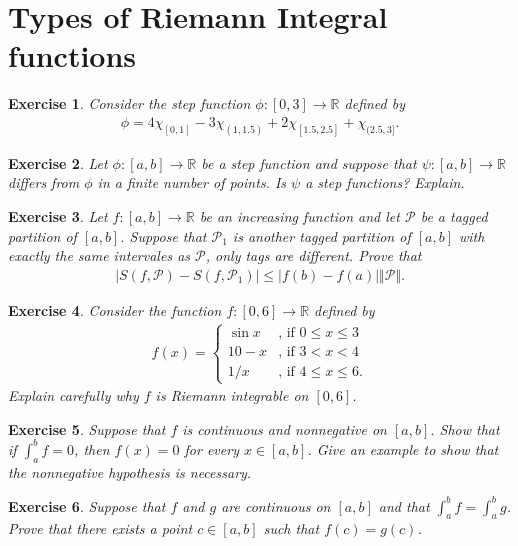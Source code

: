 \documentclass[12pt]{article}
\newcommand{\bR}{\mathbb{R}}
\newcommand{\cP}{\mathcal{P}}
\newcommand{\ra}{\rightarrow}
\theoremstyle{plain}
\newtheorem{exer}{\textbf{Exercise}}}
\theoremstyle{plain}
\theoremstyle{plain}
\theoremstyle{plain}
\begin{document}
\section{Types of Riemann Integral functions}
\begin{exer}
Consider the step function $\phi : [0, 3] \ra \bR$ defined by 
	\begin{align*}
	\phi = 4 \chi_{[0, 1]} - 3 \chi_{(1, 1.5)} + 2 \chi_{[1.5, 2.5]} + \chi_{(2.5, 3]} .
	\end{align*}
\end{exer}

\begin{exer}
Let $\phi : [a, b] \ra \bR$ be a step function and suppose that $\psi : [a, b] \ra \bR$ differs from $\phi$ in a finite number of points. Is $\psi$ a step functions? Explain.
\end{exer}

\begin{exer}
Let $f : [a, b] \ra \bR$ be an increasing function and let $\cP$ be a tagged partition of $[a, b]$. Suppose that $\cP_1$ is another tagged partition of $[a, b]$ with exactly the same intervales as $\cP$, only tags are different. Prove that
	\begin{align*}
	|S (f , \cP ) - S (f , \cP_1) | \leq |f (b) - f(a)| \Vert \cP \Vert .
	\end{align*}
\end{exer}

\begin{exer}
Consider the function $f : [0, 6] \ra \bR$ defined by
	\begin{align*}
	f(x) = \begin{cases}
	\sin x & \text{, if } 0 \leq x \leq 3 \\
	10 - x & \text{, if } 3 < x < 4 \\
	1/x & \text{, if } 4 \leq x \leq 6 .
	\end{cases}
	\end{align*}
Explain carefully why $f$ is Riemann integrable on $[0, 6]$.
\end{exer}

\begin{exer}
Suppose that $f$ is continuous and nonnegative on $[a, b]$. Show that if $\int_a^b f = 0$, then $f(x) = 0$ for every $x \in [a, b]$. Give an example to show that the nonnegative hypothesis is necessary.
\end{exer}

\begin{exer}
Suppose that $f$ and $g$ are continuous on $[a, b]$ and that $\int_a^b f = \int_a^b g$. Prove that there exists a point $c \in [a, b]$ such that $f(c) = g(c)$.
\end{exer}
\end{document}
